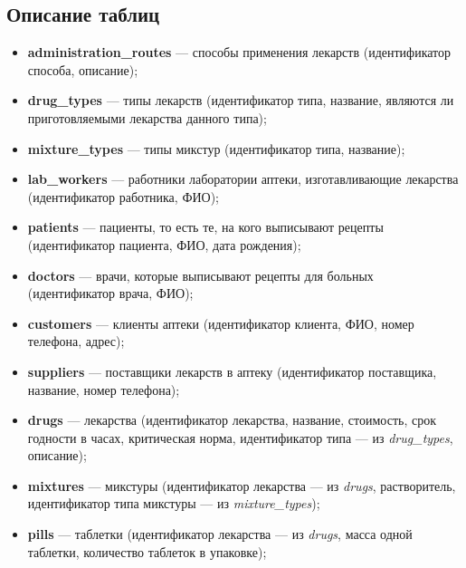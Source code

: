 \documentclass[a4paper]{article}
\newcommand{\dbtable}[1]{\textbf{#1}}
\newcommand{\dbtableref}[1]{\textit{#1}}
\begin{document}
		\subsection{Описание таблиц}
			\begin{itemize}
				\item \dbtable{administration\_routes} --- способы применения лекарств (идентификатор способа, описание);
				
				\item \dbtable{drug\_types} --- типы лекарств (идентификатор типа, название, являются ли приготовляемыми лекарства данного типа);
				
				\item \dbtable{mixture\_types} --- типы микстур (идентификатор типа, название);
				
				\item \dbtable{lab\_workers} --- работники лаборатории аптеки, изготавливающие лекарства (идентификатор работника, ФИО);
				
				\item \dbtable{patients} --- пациенты, то есть те, на кого выписывают рецепты (идентификатор пациента, ФИО, дата рождения);
				
				\item \dbtable{doctors} --- врачи, которые выписывают рецепты для больных (идентификатор врача, ФИО);
				
				\item \dbtable{customers} --- клиенты аптеки (идентификатор клиента, ФИО, номер телефона, адрес);
				
				\item \dbtable{suppliers} --- поставщики лекарств в аптеку (идентификатор поставщика, название, номер телефона);
				
				\item \dbtable{drugs} --- лекарства (идентификатор лекарства, название, стоимость, срок годности в часах, критическая норма, идентификатор типа --- из \dbtableref{drug\_types}, описание);
				
				\item \dbtable{mixtures} --- микстуры (идентификатор лекарства --- из \dbtableref{drugs}, растворитель, идентификатор типа микстуры --- из \dbtableref{mixture\_types});
				
				\item \dbtable{pills} --- таблетки (идентификатор лекарства --- из \dbtableref{drugs}, масса одной таблетки, количество таблеток в упаковке);
				

\end{itemize}
\end{document}
